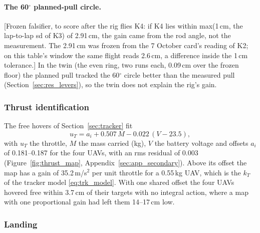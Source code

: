 \paragraph{The 60$^\circ$ planned-pull circle.} [Frozen falsifier, to score after the rig flies K4: if K4 lies within
max(1\,cm, the lap-to-lap sd of K3) of 2.91\,cm, the gain came from the rod angle, not the measurement. The 2.91\,cm
was frozen from the 7 October card's reading of K2; on this table's window the same flight reads 2.6\,cm, a
difference inside the 1\,cm tolerance.] In the twin (the even ring, two runs each, 0.09\,cm over the frozen floor) the planned
pull tracked the 60$^\circ$ circle better than the measured pull (Section~\ref{sec:res_levers}), so the twin does not
explain the rig's gain.

\subsubsection{Thrust identification}
\label{sec:thrust_id}

The free hovers of Section~\ref{sec:tracker} fit
\begin{equation}
    u_T = a_i + 0.507\,M - 0.022\,(V - 23.5),
    \label{eq:thrust_fit}
\end{equation}
with $u_T$ the throttle, $M$ the mass carried (kg), $V$ the battery voltage and offsets $a_i$ of
0.181--0.187 for the four UAVs, with an rms residual of 0.003 (Figure~\ref{fig:thrust_map}, Appendix~\ref{sec:app_secondary}). Above its
offset the map has a gain of 35.2\,m/s$^2$ per unit throttle for a 0.55\,kg UAV, which is the $k_T$ of
the tracker model \eqref{eq:trk_model}. With one shared offset the four UAVs hovered free within
3.7\,cm of their targets with no integral action, where a map with one proportional gain had left them 14--17\,cm low.



\subsubsection{Landing}
\label{sec:sim_landing}

